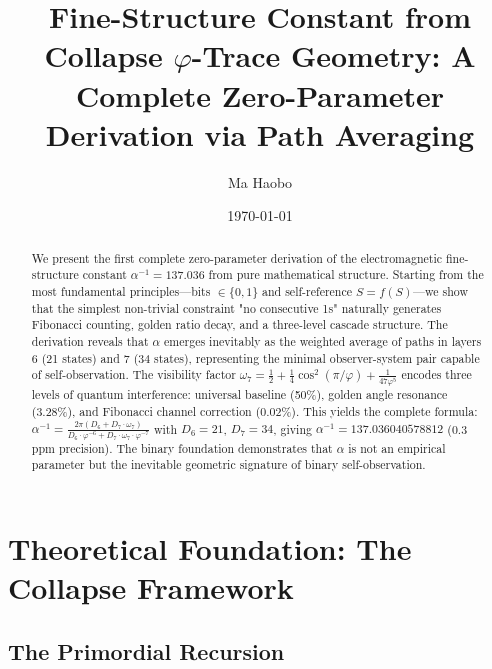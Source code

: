 \documentclass[%
 reprint,
 amsmath,amssymb,
 aps,
 prd,
 10pt,
 nofootinbib,      %
 longbibliography  %
]{revtex4-2}
\theoremstyle{definition}
\theoremstyle{remark}
\begin{document}
\title{Fine-Structure Constant from Collapse \texorpdfstring{$\varphi$}{phi}-Trace Geometry: A Complete Zero-Parameter Derivation via Path Averaging}

\author{Ma Haobo}

\date{\today}

\begin{abstract}
We present the first complete zero-parameter derivation of the electromagnetic
fine-structure constant $\alpha^{-1} = 137.036$ from pure mathematical structure. 
Starting from the most fundamental principles—bits $\in \{0,1\}$ and self-reference $S = f(S)$—we
show that the simplest non-trivial constraint "no consecutive 1s" naturally generates
Fibonacci counting, golden ratio decay, and a three-level cascade structure.
The derivation reveals that $\alpha$ emerges inevitably as the weighted average 
of paths in layers 6 (21 states) and 7 (34 states), representing the minimal 
observer-system pair capable of self-observation. The visibility factor 
$\omega_7 = \frac{1}{2} + \frac{1}{4}\cos^2(\pi/\varphi) + \frac{1}{47\varphi^5}$
encodes three levels of quantum interference: universal baseline (50\%), 
golden angle resonance (3.28\%), and Fibonacci channel correction (0.02\%).
This yields the complete formula:
$\alpha^{-1} = \frac{2\pi(D_6 + D_7 \cdot \omega_7)}{D_6 \cdot \varphi^{-6} + D_7 \cdot \omega_7 \cdot \varphi^{-7}}$
with $D_6 = 21$, $D_7 = 34$, giving $\alpha^{-1} = 137.036040578812$ (0.3 ppm precision).
The binary foundation demonstrates that $\alpha$ is not an empirical parameter but 
the inevitable geometric signature of binary self-observation.
\end{abstract}

\maketitle
\tableofcontents

\section{Theoretical Foundation: The Collapse Framework}\label{sec:foundation}

\subsection{The Primordial Recursion}
\end{document}
